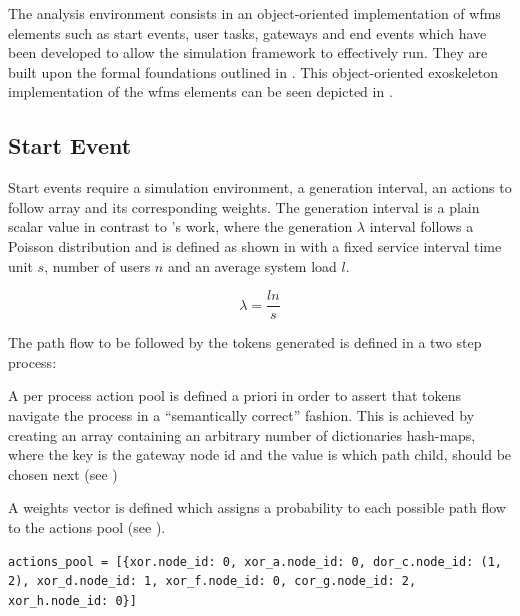 The analysis environment consists in an object-oriented implementation of \gls{wfms} elements such as start events, user tasks, gateways and end events which have been developed to allow the simulation framework to effectively run. They are built upon the formal foundations outlined in . This object-oriented exoskeleton implementation of the \gls{wfms} elements can be seen depicted in .


\subsection{Start Event}
\label{subsec:start_event}

Start events require a simulation environment, a generation interval, an actions to follow array and its corresponding weights. The generation interval is a plain scalar value in contrast to \citet{Zeng2005}'s work, where the generation $\lambda$ interval follows a Poisson distribution and is defined as shown in  with a fixed service interval time unit $s$, number of users $n$ and an average system load $l$.

\begin{equation}
\label{eq:generation_interval}
	\lambda = \frac{l n}{s}
\end{equation}

The path flow to be followed by the tokens generated is defined in a two step process:
\begin{enumerate*}
	\item A per process action pool is defined a priori in order to assert that tokens navigate the process in a ``semantically correct'' fashion. This is achieved by creating an array containing an arbitrary number of dictionaries \ie hash-maps, where the key is the gateway node id and the value is which path \ie child, should be chosen next (see )
	\item A weights vector is defined which assigns a probability to each possible path flow to the actions pool (see ).
\end{enumerate*}

\begin{lstlisting}[caption=Actions pool,label=lst:actions_pool,style=CustomPython]
actions_pool = [{xor.node_id: 0, xor_a.node_id: 0, dor_c.node_id: (1, 2), xor_d.node_id: 1, xor_f.node_id: 0, cor_g.node_id: 2, xor_h.node_id: 0}]
\end{lstlisting}

